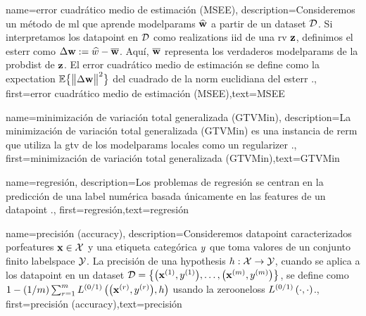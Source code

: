 {name={error cuadrático medio de estimación (MSEE)},
	description={Consideremos un método de \gls{ml} que aprende 
		\gls{modelparams} $\widehat{{\bf w}}$ a partir de un \gls{dataset} $\mathcal{D}$. 
		Si interpretamos los \gls{datapoint} en $\mathcal{D}$ como \gls{realization}s \gls{iid} de una \gls{rv} ${\bf z}$, 
		definimos el \gls{esterr} como $\Delta {\bf w} := \widehat{w} - \overline{{\bf w}}$. 
		Aquí, $\overline{{\bf w}}$ representa los verdaderos \gls{modelparams} de la \gls{probdist} 
		de ${\bf z}$. El error cuadrático medio de estimación se define como la \gls{expectation} $\mathbb{E} \big\{ \big\| \Delta {\bf w} \big\|^{2} \big\}$ del cuadrado de la 
		\gls{norm} euclidiana del \gls{esterr} \cite{LC,kay}.},
	first={error cuadrático medio de estimación (MSEE)},text={MSEE} 
}

{name={minimización de variación total generalizada (GTVMin)},
	description={La minimización de variación total generalizada (GTVMin) es una instancia de \gls{rerm} 
	que utiliza la \gls{gtv} de los \gls{modelparams} locales como un \gls{regularizer} \cite{ClusteredFLTVMinTSP}.},
	first={minimización de variación total generalizada (GTVMin)},text={GTVMin} 
}

{name={regresión},
	description={Los problemas de regresión se centran en la predicción de una 
		\gls{label} numérica basada únicamente en las \gls{feature}s de un \gls{datapoint} \cite[Ch. 2]{MLBasics}.},
	first={regresión},text={regresión} 
}

{name={precisión (accuracy)},
	description={Consideremos \gls{datapoint} caracterizados por\gls{feature}s ${\bf x} \in \mathcal{X}$ y 
		una etiqueta categórica $y$ que toma valores de un conjunto finito \gls{labelspace} $\mathcal{Y}$. La 
		precisión de una \gls{hypothesis} $h: \mathcal{X} \rightarrow \mathcal{Y}$, cuando se aplica a los
		\gls{datapoint} en un \gls{dataset} $\mathcal{D} = \big\{ \big({\bf x}^{(1)}, y^{(1)} \big), \ldots, \big({\bf x}^{(m)},y^{(m)}\big) \big\}$, 
		se define como $1 - (1/m)\sum_{r=1}^{m} L^{(0/1)}\left(\big({\bf x}^{(r)},y^{(r)}\big),h \right)$ usando la \gls{zerooneloss} $L^{(0/1)}\left(\cdot,\cdot \right)$.},
	first={precisión (accuracy)},text={precisión} 
}






